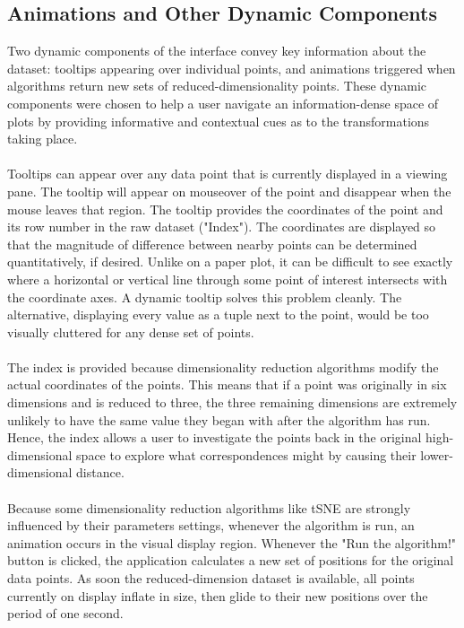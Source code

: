 \documentclass{sigchi}
\begin{document}
\subsection{Animations and Other Dynamic Components}
%
Two dynamic components of the interface convey key information about the dataset: tooltips appearing over individual points, and animations triggered when algorithms return new sets of reduced-dimensionality points. %
%
These dynamic components were chosen to help a user navigate an information-dense space of plots by providing informative and contextual cues as to the transformations taking place. %
%
\\\\
%
Tooltips can appear over any data point that is currently displayed in a viewing pane. %
%
The tooltip will appear on mouseover of the point and disappear when the mouse leaves that region. %
%
The tooltip provides the coordinates of the point and its row number in the raw dataset ("Index"). %
%
The coordinates are displayed so that the magnitude of difference between nearby points can be determined quantitatively, if desired. %
%
Unlike on a paper plot, it can be difficult to see exactly where a horizontal or vertical line through some point of interest intersects with the coordinate axes. %
%
A dynamic tooltip solves this problem cleanly. %
%
The alternative, displaying every value as a tuple next to the point, would be too visually cluttered for any dense set of points. %
%
\\\\
%
The index is provided because dimensionality reduction algorithms modify the actual coordinates of the points. %
%
This means that if a point was originally in six dimensions and is reduced to three, the three remaining dimensions are extremely unlikely to have the same value they began with after the algorithm has run. %
%
Hence, the index allows a user to investigate the points back in the original high-dimensional space to explore what correspondences might by causing their lower-dimensional distance. %
\\\\
%
Because some dimensionality reduction algorithms like tSNE are strongly influenced by their parameters settings, whenever the algorithm is run, an animation occurs in the visual display region. %
%
Whenever the "Run the algorithm!" button is clicked, the application calculates a new set of positions for the original data points. %
%
As soon the reduced-dimension dataset is available, all points currently on display inflate in size, then glide to their new positions over the period of one second.
\end{document}
